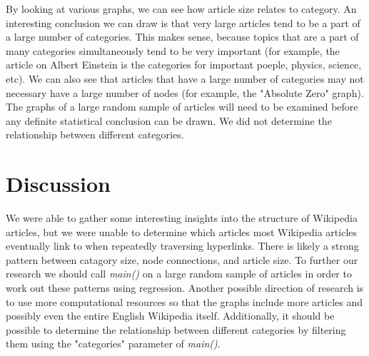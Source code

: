 \documentclass[fontsize=11pt]{article}
\begin{document}
	By looking at various graphs, we can see how article size relates to category. An interesting conclusion we can draw is that very large articles tend to be a part of a large number of categories. This makes sense, because topics that are a part of many categories simultaneously tend to be very important (for example, the article on Albert Einstein is the categories for important poeple, physics, science, etc). We can also see that articles that have a large number of categories may not necessary have a large number of nodes (for example, the "Absolute Zero" graph). The graphs of a large random sample of articles will need to be examined before any definite statistical conclusion can be drawn. We did not determine the relationship between different categories. 
	
	
\section*{Discussion}

	We were able to gather some interesting insights into the structure of Wikipedia articles, but we were unable to determine which articles most Wikipedia articles eventually link to when repeatedly traversing hyperlinks. There is likely a strong pattern between catagory size, node connections, and article size. To further our research we should call \textit{main()} on a large random sample of articles in order to work out these patterns using regression. Another possible direction of research is to use more computational resources so that the graphs include more articles and possibly even the entire English Wikipedia itself. Additionally, it should be possible to determine the relationship between different categories by filtering them using the "categories" parameter of \textit{main()}. 
	

	
    
    
    
    
    
    
    

    

   

   
\end{document}
